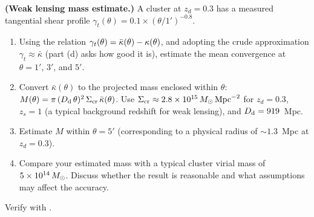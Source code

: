 \begin{exercise}
\label{ex:weak_lensing_mass}
\textbf{(Weak lensing mass estimate.)}
A cluster at $z_d = 0.3$ has a measured tangential shear profile
$\gamma_t(\theta) = 0.1\times(\theta/1')^{-0.8}$.
\begin{enumerate}[label=(\alph*)]
    \item Using the relation $\gamma_t(\theta) = \bar{\kappa}(\theta)
          - \kappa(\theta)$, and adopting the crude approximation
          $\gamma_t \approx \bar{\kappa}$ (part (d) asks how good it
          is), estimate the mean convergence at
          $\theta = 1'$, $3'$, and $5'$.
    \item Convert $\bar{\kappa}(\theta)$ to the projected mass
          enclosed within $\theta$:
          $M(\theta) = \pi\,(D_{\mathrm{d}}\,\theta)^2\,\Sigma_{\mathrm{cr}}\,\bar{\kappa}(\theta)$.
          Use $\Sigma_{\mathrm{cr}} \approx 2.8\times 10^{15}\,M_{\odot}\,\mathrm{Mpc}^{-2}$
          for $z_d = 0.3$, $z_s = 1$ (a typical background redshift
          for weak lensing), and $D_{\mathrm{d}} = 919$~Mpc.
    \item Estimate $M$ within $\theta = 5'$ (corresponding to a
          physical radius of $\sim 1.3$~Mpc at $z_d = 0.3$).
    \item Compare your estimated mass with a typical cluster virial
          mass of $5\times 10^{14}\,M_{\odot}$.  Discuss whether the result is
          reasonable and what assumptions may affect the accuracy.
\end{enumerate}
Verify with
.
\end{exercise}
